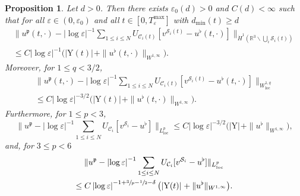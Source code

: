 \documentclass[11pt]{article}
\let\oldbigcup\bigcup
\newcommand{\R}{\mathbb{R}}
\let\eps\varepsilon
\newcommand{\loc}{\mathrm{loc}}
\newcommand{\rY}{\mathrm{Y}}
\newtheorem{Proposition}[thm]{Proposition}
\theoremstyle{definition}
\theoremstyle{remark}
\begin{document}
\begin{Proposition} \label{pro:u^p.U}
Let $d>0$. Then there exists $\eps_0(d) > 0$ and $C(d) < \infty$ such that for all $\eps \in (0,\eps_0)$ and all $t \in [0,T_\eps^{\max}]$
with $d_{\min}(t) \geq d$
\begin{multline} \label{est:fluid.velocities.-1}
\|u^\mathfrak{p}(t,\cdot) - \left|\log \eps\right|^{-1} \sum_{1 \leq i \leq N} U_{\mathcal C_i(t)}[v^{{\mathcal S}_i(t)} - u^\flat(t,\cdot)]\|_{\dot H^{1} (\R^3 \smallsetminus \oldbigcup_i {\mathcal S}_i(t)) }
\\
\leq C \left|\log \eps\right|^{-1} \big(|\rY(t)|_{} + \|u^\flat(t,\cdot)\|_{W^{1,\infty}} \big).
\end{multline}
Moreover, for $1 \leq q < 3/2$,
\begin{multline} \label{est:fluid.velocities.0}
\|u^\mathfrak{p}(t,\cdot) - \left|\log \eps\right|^{-1} \sum_{1 \leq i \leq N} U_{\mathcal C_i(t)}[v^{{\mathcal S}_i(t)} - u^\flat(t,\cdot)]\|_{W^{1,q}_{\loc}}
\\ \leq C \left|\log \eps\right|^{-3/2} \big(|\rY(t)|_{} + \|u^\flat(t,\cdot)\|_{W^{1,\infty}} \big).
\end{multline}
Furthermore, for $1 \leq p< 3$,
\begin{equation} \label{est:fluid.velocities.1}
\|u^\mathfrak{p} - \left|\log \eps\right|^{-1} \sum_{1 \leq i \leq N} U_{\mathcal C_i}[v^{{\mathcal S}_i} - u^\flat]\|_{L^p_{\loc}} \leq C \left|\log \eps\right|^{-3/2} \big(|\rY|_{} + \|u^\flat\|_{W^{1,\infty}} \big),
\end{equation}
and, for $3 \leq p < 6$
\begin{multline} \label{est:fluid.velocities.comment}
\|u^\mathfrak{p} - \left|\log \eps\right|^{-1} \sum_{1 \leq i \leq N} U_{\mathcal C_i}[v^{{\mathcal S}_i} - u^\flat]\|_{L^p_{\loc}}\\
\leq C \left|\log \eps\right|^{-1 + {\sfrac 3 p - \sfrac 1 2 - \delta}} \big(|\rY(t)|_{} + \|u^\flat\|_{W^{1,\infty}} \big).
\end{multline}
\end{Proposition}
\end{document}
